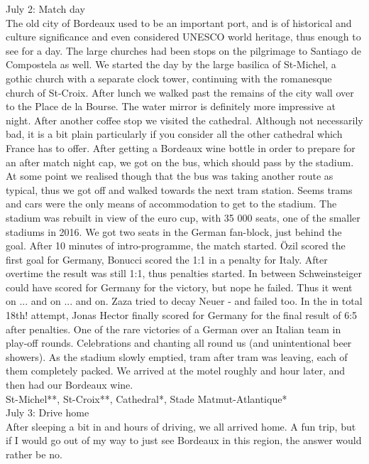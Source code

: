 July 2: Match day\\
The old city of Bordeaux used to be an important port, and is of historical and culture significance and even considered UNESCO world heritage, thus enough to see for a day. The large churches had been stops on the pilgrimage to Santiago de Compostela as well. We started the day by the large basilica of St-Michel, a gothic church with a separate clock tower, continuing with the romanesque church of St-Croix. After lunch we walked past the remains of the city wall over to the Place de la Bourse. The water mirror is definitely more impressive at night. After another coffee stop we visited the cathedral. Although not necessarily bad, it is a bit plain particularly if you consider all the other cathedral which France has to offer. After getting a Bordeaux wine bottle in order to prepare for an after match night cap, we got on the bus, which should pass by the stadium. At some point we realised though that the bus was taking another route as typical, thus we got off and walked towards the next tram station. Seems trams and cars were the only means of accommodation to get to the stadium. The stadium was rebuilt in view of the euro cup, with 35 000 seats, one of the smaller stadiums in 2016. We got two seats in the German fan-block, just behind the goal. After 10 minutes of intro-programme, the match started. \"Ozil scored the first goal for Germany, Bonucci scored the 1:1 in a penalty for Italy. After overtime the result was still 1:1, thus penalties started. In between Schweinsteiger could have scored for Germany for the victory, but nope he failed. Thus it went on ... and on ... and on. Zaza tried to decay Neuer - and failed too. In the in total 18th! attempt, Jonas Hector finally scored for Germany for the final result of 6:5 after penalties. One of the rare victories of a German over an Italian team in play-off rounds. Celebrations and chanting all round us (and unintentional beer showers). As the stadium slowly emptied, tram after tram was leaving, each of them completely packed. We arrived at the motel roughly and hour later, and then had our Bordeaux wine.\\

St-Michel**, St-Croix**, Cathedral*, Stade Matmut-Atlantique*\\

July 3: Drive home\\
After sleeping a bit in and hours of driving, we all arrived home. A fun trip, but if I would go out of my way to just see Bordeaux in this region, the answer would rather be no.

